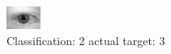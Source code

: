 \begin{figure}[h!]
\begin{center}
\includegraphics[width=0.60\columnwidth]{figures/ID599_class_2_target_3.png}
\end{center}
\caption{ Classification: 2 actual target: 3}
\label{fig:ID599_class_2_target_3}
\end{figure}
